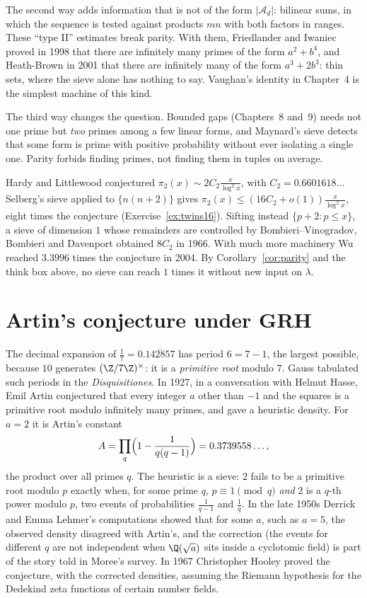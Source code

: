 The second way adds information that is not of the form $|\mathcal A_d|$: bilinear sums, in which the sequence is tested against products $mn$ with both factors in ranges. These ``type II'' estimates break parity. With them, Friedlander and Iwaniec proved in 1998 that there are infinitely many primes of the form $a^2+b^4$, and Heath-Brown in 2001 that there are infinitely many of the form $a^3+2b^3$: thin sets, where the sieve alone has nothing to say. Vaughan's identity in Chapter~4 is the simplest machine of this kind.

The third way changes the question. Bounded gaps (Chapters~8 and~9) needs not one prime but \emph{two} primes among a few linear forms, and Maynard's sieve detects that some form is prime with positive probability without ever isolating a single one. Parity forbids finding primes, not finding them in tuples on average.

\begin{remark}
Hardy and Littlewood conjectured $\pi_2(x)\sim2C_2\frac x{\log^2x}$, with $C_2=0.6601618\ldots$ Selberg's sieve applied to $\{n(n+2)\}$ gives $\pi_2(x)\le(16C_2+o(1))\frac x{\log^2x}$, eight times the conjecture (Exercise~\ref{ex:twins16}). Sifting instead $\{p+2:p\le x\}$, a sieve of dimension $1$ whose remainders are controlled by Bombieri--Vinogradov, Bombieri and Davenport obtained $8C_2$ in 1966. With much more machinery Wu reached $3.3996$ times the conjecture in 2004. By Corollary~\ref{cor:parity} and the think box above, no sieve can reach $1$ times it without new input on $\lambda$.
\end{remark}

\section{Artin's conjecture under GRH}

The decimal expansion of $\frac17=0.\overline{142857}$ has period $6=7-1$, the largest possible, because $10$ generates $(\Z/7\Z)^\times$: it is a \emph{primitive root} modulo $7$. Gauss tabulated such periods in the \emph{Disquisitiones}. In 1927, in a conversation with Helmut Hasse, Emil Artin conjectured that every integer $a$ other than $-1$ and the squares is a primitive root modulo infinitely many primes, and gave a heuristic density. For $a=2$ it is Artin's constant
\[
A=\prod_q\Bigl(1-\frac1{q(q-1)}\Bigr)=0.3739558\ldots,
\]
the product over all primes $q$. The heuristic is a sieve: $2$ fails to be a primitive root modulo $p$ exactly when, for some prime $q$, $p\equiv1\pmod q$ \emph{and} $2$ is a $q$-th power modulo $p$, two events of probabilities $\frac1{q-1}$ and $\frac1q$. In the late 1950s Derrick and Emma Lehmer's computations showed that for some $a$, such as $a=5$, the observed density disagreed with Artin's, and the correction (the events for different $q$ are not independent when $\Q(\sqrt a)$ sits inside a cyclotomic field) is part of the story told in Moree's survey. In 1967 Christopher Hooley proved the conjecture, with the corrected densities, assuming the Riemann hypothesis for the Dedekind zeta functions of certain number fields.

